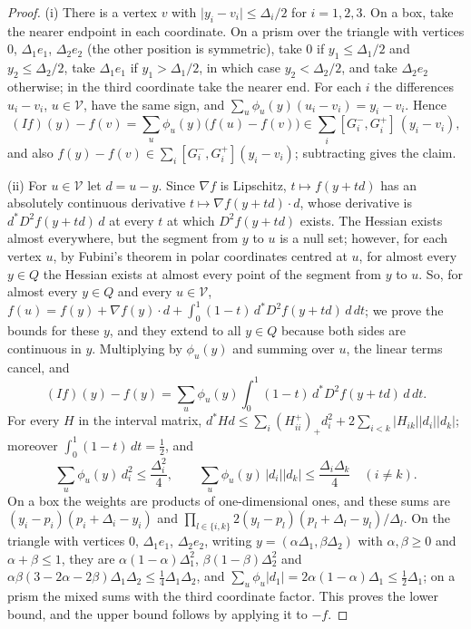 \documentclass[11pt]{amsart}
\theoremstyle{definition}
\theoremstyle{remark}
\newcommand{\abs}[1]{\lvert #1\rvert}
\begin{document}
\begin{proof}
(i) There is a vertex $v$ with $\abs{y_i-v_i}\le\Delta_i/2$ for $i=1,2,3$. On a box, take the nearer endpoint in each coordinate. On a prism over the triangle with vertices $0$, $\Delta_1e_1$, $\Delta_2e_2$ (the other position is symmetric), take $0$ if $y_1\le\Delta_1/2$ and $y_2\le\Delta_2/2$, take $\Delta_1e_1$ if $y_1>\Delta_1/2$, in which case $y_2<\Delta_2/2$, and take $\Delta_2e_2$ otherwise; in the third coordinate take the nearer end. For each $i$ the differences $u_i-v_i$, $u\in\mathcal V$, have the same sign, and $\sum_u\phi_u(y)(u_i-v_i)=y_i-v_i$. Hence
\[
  (If)(y)-f(v)=\sum_u\phi_u(y)\bigl(f(u)-f(v)\bigr)\in\sum_i[G_i^-,G_i^+]\,(y_i-v_i),
\]
and also $f(y)-f(v)\in\sum_i[G_i^-,G_i^+](y_i-v_i)$; subtracting gives the claim.

(ii) For $u\in\mathcal V$ let $d=u-y$. Since $\nabla f$ is Lipschitz, $t\mapsto f(y+td)$ has an absolutely continuous derivative $t\mapsto\nabla f(y+td)\cdot d$, whose derivative is $d^*D^2f(y+td)\,d$ at every $t$ at which $D^2f(y+td)$ exists. The Hessian exists almost everywhere, but the segment from $y$ to $u$ is a null set; however, for each vertex $u$, by Fubini's theorem in polar coordinates centred at $u$, for almost every $y\in Q$ the Hessian exists at almost every point of the segment from $y$ to $u$. So, for almost every $y\in Q$ and every $u\in\mathcal V$,
$f(u)=f(y)+\nabla f(y)\cdot d+\int_0^1(1-t)\,d^*D^2f(y+td)\,d\,dt$; we prove the bounds for these $y$, and they extend to all $y\in Q$ because both sides are continuous in $y$. Multiplying by $\phi_u(y)$ and summing over $u$, the linear terms cancel, and
\[
  (If)(y)-f(y)=\sum_u\phi_u(y)\int_0^1(1-t)\,d^*D^2f(y+td)\,d\,dt .
\]
For every $H$ in the interval matrix, $d^*Hd\le\sum_i(H^+_{ii})_+d_i^2+2\sum_{i<k}\abs{H_{ik}}\abs{d_i}\abs{d_k}$; moreover $\int_0^1(1-t)\,dt=\frac12$, and
\[
  \sum_u\phi_u(y)\,d_i^2\le\frac{\Delta_i^2}4,\qquad \sum_u\phi_u(y)\,\abs{d_i}\abs{d_k}\le\frac{\Delta_i\Delta_k}4\quad(i\ne k).
\]
On a box the weights are products of one-dimensional ones, and these sums are $(y_i-p_i)(p_i+\Delta_i-y_i)$ and $\prod_{l\in\{i,k\}}2(y_l-p_l)(p_l+\Delta_l-y_l)/\Delta_l$. On the triangle with vertices $0$, $\Delta_1e_1$, $\Delta_2e_2$, writing $y=(\alpha\Delta_1,\beta\Delta_2)$ with $\alpha,\beta\ge0$ and $\alpha+\beta\le1$, they are $\alpha(1-\alpha)\Delta_1^2$, $\beta(1-\beta)\Delta_2^2$ and $\alpha\beta(3-2\alpha-2\beta)\Delta_1\Delta_2\le\frac14\Delta_1\Delta_2$, and $\sum_u\phi_u\abs{d_1}=2\alpha(1-\alpha)\Delta_1\le\frac12\Delta_1$; on a prism the mixed sums with the third coordinate factor. This proves the lower bound, and the upper bound follows by applying it to $-f$.
\end{proof}
\end{document}
